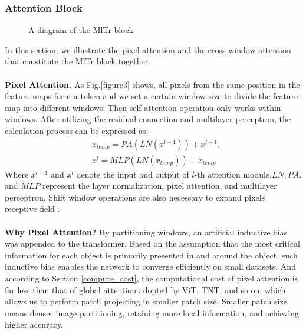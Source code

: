 \documentclass{article} \usepackage[numbers,sort&compress]{natbib}
\begin{document}
\subsubsection{Attention Block}
\begin{figure*}[h]

\begin{center}
\end{center}
\caption{A diagram of the MlTr block}
\end{figure*}
In this section, we illustrate the pixel attention and the cross-window attention that constitute the MlTr block together.\\\\
\textbf{Pixel Attention.} As Fig.\textcolor{red}{\ref{figure3}} shows, all pixels from the same position in the feature maps form a token and we set a certain window size to divide the feature map into different windows. Then self-attention \cite{vaswani2017attention} operation only works within windows. After utilizing the residual connection and multilayer perceptron, the calculation process can be expressed as:
\begin{align}
& \displaystyle x_{temp} = PA(LN(x^{l-1})) + x^{l-1}, \\
& \displaystyle x^l = MLP(LN(x_{temp})) + x_{temp} 
\end{align}
Where $x^{l-1}$ and $x^l$ denote the input and output of $l$-th attention module.$LN, PA$, and $MLP$ represent the layer normalization, pixel attention, and multilayer perceptron. Shift window operations are also necessary to expand pixels' receptive field \cite{liu2021swin}.\\\\
\textbf{Why Pixel Attention?} By partitioning windows, an artificial inductive bias was appended to the transformer. Based on the assumption that the most critical information for each object is primarily presented in and around the object, such inductive bias enables the network to converge efficiently on small datasets. And according to Section \ref{compute_cost}, the computational cost of pixel attention is far less than that of global attention adopted by ViT, TNT, and so on, which allows us to perform patch projecting in smaller patch size. Smaller patch size 
means denser image partitioning, retaining more local information, and achieving higher accuracy.\\\\
\end{document}
